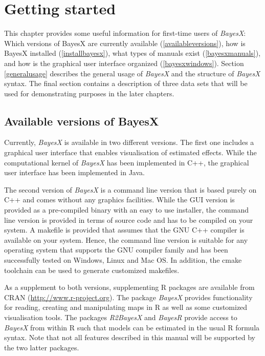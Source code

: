 \chapter{Getting started}
\label{gettingstarted}

This chapter provides some useful information for first-time users
of {\em BayesX}: Which versions of BayesX are currently available
(\autoref{availableversions}), how is BayesX installed
(\autoref{installbayesx}), what types of manuals exist
(\autoref{bayesxmanuals}), and how is the graphical user interface
organized (\autoref{bayesxwindows}). Section \ref{generalusage}
describes the general usage of {\em BayesX} and the structure of
{\em BayesX} syntax. The final section contains a description of
three data sets that will be used for demonstrating purposes in
the later chapters.

\section{Available versions of BayesX}
\label{availableversions}    

Currently, {\it BayesX} is available in two different versions. The first one includes a graphical user interface that enables
visualisation of estimated effects. While the computational kernel of {\it BayesX} has been implemented in C++, the graphical
user interface has been implemented in Java.

The second version of {\it BayesX} is a command line version that is based purely on C++ and comes without any graphics
facilities. While the GUI version is provided as a pre-compiled binary with an easy to use installer, the command line
version is provided in terms of source code and has to be compiled on your system. A makefile is provided that assumes that
the GNU C++ compiler is available on your system. Hence, the command line version is suitable for any operating system that
supports the GNU compiler family and has been successfully tested on Windows, Linux and Mac OS. In addition, the cmake toolchain can be used to generate customized makefiles.

As a supplement to both versions, supplementing R packages are available from CRAN (\href{http://www.r-project.org}{http://www.r-project.org}). The package  {\it BayesX} provides functionality for reading, creating and manipulating maps in R as well as some customized visualisation tools. The packages {\it R2BayesX} and {\it BayesR} provide access to {\it BayesX} from within R such that models can be estimated in the usual R formula syntax. Note that not all features described in this manual will be supported by the two latter packages.

